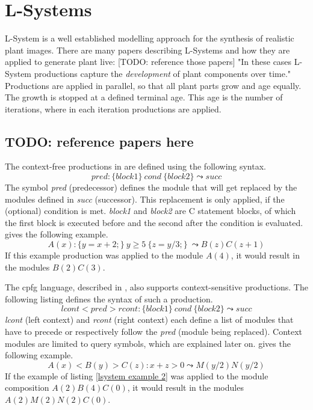 \documentclass[11pt, a4paper]{report}
\begin{document}
\section{L-Systems}

L-System is a well established modelling approach for the synthesis of realistic plant images. There are many papers describing L-Systems and how they are applied to generate plant live: [TODO: reference those papers] "In these cases L-System productions capture the \textit{development} of plant components over time." \citep{PrusinkiewiczEtAl:2001} Productions are applied in parallel, so that all plant parts grow and age equally. The growth is stopped at a defined terminal age. This age is the number of iterations, where in each iteration productions are applied.
\subsection{TODO: reference papers here}
The context-free productions in \citep{PrusinkiewiczEtAl:2001} are defined using the following syntax.
\begin{equation} \label{lsystem context free}
    pred : \{block1\}\ cond\ \{block2\} \leadsto succ
\end{equation}
The symbol \textit{pred} (predecessor) defines the module that will get replaced by the modules defined in \textit{succ} (successor). This replacement is only applied, if the (optional) condition is met. \textit{block1} and \textit{block2} are C statement blocks, of which the first block is executed before and the second after the condition is evaluated. \citep{PrusinkiewiczEtAl:2001} gives the following example.
\begin{equation} \label{lsystem example 1}
    A(x) : \{y = x + 2;\}\ y \geq 5\ \{z = y / 3;\}\ \leadsto B(z)C(z + 1)
\end{equation}
If this example production was applied to the module $A(4)$, it would result in the modules $B(2)C(3)$.

The cpfg language, described in \citep{PrusinkiewiczEtAl:2001}, also supports context-sensitive productions. The following listing defines the syntax of such a production.
\begin{equation} \label{lsystem context sensitive}
    lcont < pred > rcont : \{block1\}\ cond\ \{block2\} \leadsto succ
\end{equation}
\textit{lcont} (left context) and \textit{rcont} (right context) each define a list of modules that have to precede or respectively follow the \textit{pred} (module being replaced). Context modules are limited to query symbols, which are explained later on. \citep{PrusinkiewiczEtAl:2001} gives the following example.
\begin{equation} \label{lsystem example 2}
    A(x) < B(y) > C(z) : x + z > 0 \leadsto M(y / 2)N(y / 2)
\end{equation}
If the example of listing \ref{lsystem example 2} was applied to the module composition $A(2)B(4)C(0)$, it would result in the modules $A(2)M(2)N(2)C(0)$.
\end{document}

